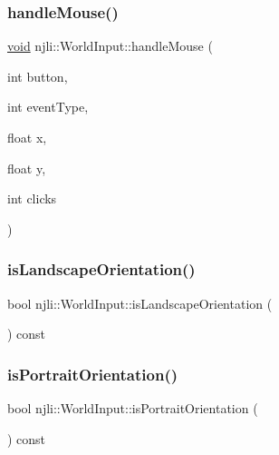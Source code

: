 \subsubsection{\texorpdfstring{handle\+Mouse()}{handleMouse()}}
{\footnotesize\ttfamily \mbox{\hyperlink{_thread_8h_af1e856da2e658414cb2456cb6f7ebc66}{void}} njli\+::\+World\+Input\+::handle\+Mouse (\begin{DoxyParamCaption}\item[{int}]{button,  }\item[{int}]{event\+Type,  }\item[{float}]{x,  }\item[{float}]{y,  }\item[{int}]{clicks }\end{DoxyParamCaption})}

\mbox{\label{classnjli_1_1_world_input_a779e7f72cc5681b9500a1fbd8004109b}} 
\subsubsection{\texorpdfstring{is\+Landscape\+Orientation()}{isLandscapeOrientation()}}
{\footnotesize\ttfamily bool njli\+::\+World\+Input\+::is\+Landscape\+Orientation (\begin{DoxyParamCaption}{ }\end{DoxyParamCaption}) const}

\mbox{\label{classnjli_1_1_world_input_a07a0e30b12ae436d0cfecdedfedac7de}} 
\subsubsection{\texorpdfstring{is\+Portrait\+Orientation()}{isPortraitOrientation()}}
{\footnotesize\ttfamily bool njli\+::\+World\+Input\+::is\+Portrait\+Orientation (\begin{DoxyParamCaption}{ }\end{DoxyParamCaption}) const}

